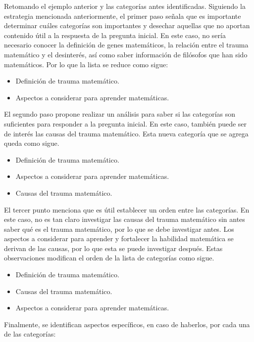 Retomando el ejemplo anterior y las categorías antes identificadas. Siguiendo la estrategia mencionada anteriormente, el primer paso señala que es importante determinar cuáles categorías son importantes y desechar aquellas que no aportan contenido útil a la respuesta de la pregunta inicial. En este caso, no sería necesario conocer la definición de genes matemáticos, la relación entre el trauma matemático y el desinterés, así como saber información de filósofos que han sido matemáticos. Por lo que la lista se reduce como sigue:

\begin{itemize}
  \item Definición de trauma matemático.
  \item Aspectos a considerar para aprender matemáticas.
\end{itemize}

El segundo paso propone realizar un análisis para saber si las categorías son suficientes para responder a la pregunta inicial. En este caso, también puede ser de interés las causas del trauma matemático. Esta nueva categoría que se agrega queda como sigue.

\begin{itemize}
  \item Definición de trauma matemático.
  \item Aspectos a considerar para aprender matemáticas.
  \item Causas del trauma matemático.
\end{itemize}

El tercer punto menciona que es útil establecer un orden entre las categorías. En este caso, no es tan claro investigar las causas del trauma matemático sin antes saber qué es el trauma matemático, por lo que se debe investigar antes. Los aspectos a considerar para aprender y fortalecer la habilidad matemática se derivan de las causas, por lo que esta se puede investigar después. Estas observaciones modifican el orden de la lista de categorías como sigue.

\begin{itemize}
  \item Definición de trauma matemático.
  \item Causas del trauma matemático.
  \item Aspectos a considerar para aprender matemáticas.
\end{itemize}

Finalmente, se identifican aspectos específicos, en caso de haberlos, por cada una de las categorías:


